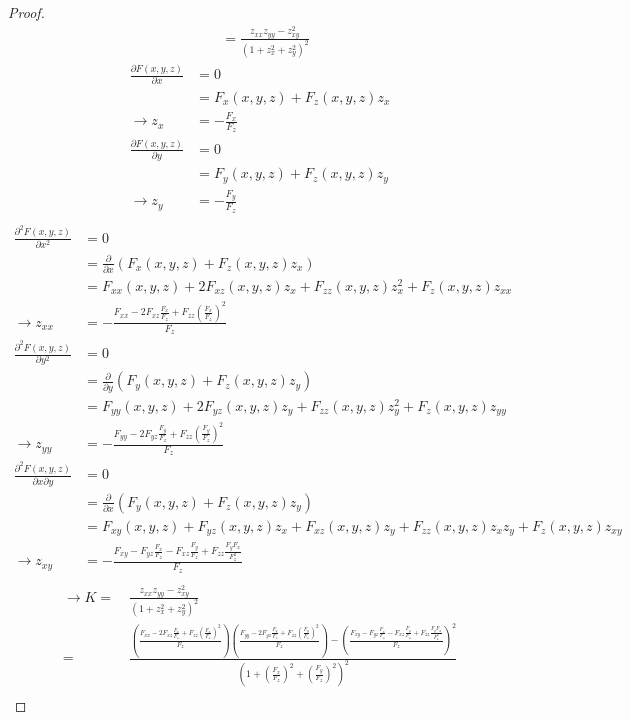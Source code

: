 \documentclass[10pt,a4paper]{article}
\begin{document}
\begin{proof}
\begin{align*}
&=\frac{z_{xx}z_{yy}-z_{xy}^2}{(1+z_x^2+z_y^2)^2}
\end{align*}
\begin{align*}
\frac{\partial F(x,y,z)}{\partial x}&=0\\
&=F_x(x,y,z)+F_z(x,y,z)z_x\\
\rightarrow z_x&=-\frac{F_x}{F_z}\\
\frac{\partial F(x,y,z)}{\partial y}&=0\\
&=F_y(x,y,z)+F_z(x,y,z)z_y\\
\rightarrow z_y&=-\frac{F_y}{F_z}\\
\end{align*}
\begin{align*}
\frac{\partial^2 F(x,y,z)}{\partial x^2}&=0\\
&=\frac{\partial}{\partial x}(F_x(x,y,z)+F_z(x,y,z)z_x)\\
&=F_{xx}(x,y,z)+2F_{xz}(x,y,z)z_x+F_{zz}(x,y,z)z_x^2+F_z(x,y,z)z_{xx}\\
\rightarrow z_{xx}&=-\frac{F_{xx}-2F_{xz}\frac{F_x}{F_z}+F_{zz}\left(\frac{F_x}{F_z}\right)^2}{F_z}\\
\frac{\partial^2 F(x,y,z)}{\partial y^2}&=0\\
&=\frac{\partial}{\partial y}(F_y(x,y,z)+F_z(x,y,z)z_y)\\
&=F_{yy}(x,y,z)+2F_{yz}(x,y,z)z_y+F_{zz}(x,y,z)z_y^2+F_z(x,y,z)z_{yy}\\
\rightarrow z_{yy}&=-\frac{F_{yy}-2F_{yz}\frac{F_y}{F_z}+F_{zz}\left(\frac{F_y}{F_z}\right)^2}{F_z}\\
\frac{\partial^2 F(x,y,z)}{\partial x\partial y}&=0\\
&=\frac{\partial}{\partial x}(F_y(x,y,z)+F_z(x,y,z)z_y)\\
&=F_{xy}(x,y,z)+F_{yz}(x,y,z)z_x+F_{xz}(x,y,z)z_y+F_{zz}(x,y,z)z_xz_y+F_z(x,y,z)z_{xy}\\
\rightarrow z_{xy}&=-\frac{F_{xy}-F_{yz}\frac{F_x}{F_z}-F_{xz}\frac{F_y}{F_z}+F_{zz}\frac{F_yF_x}{F_z^2}}{F_z}\\
\end{align*}
\begin{align*}
\rightarrow K=&\ \frac{z_{xx}z_{yy}-z_{xy}^2}{(1+z_x^2+z_y^2)^2}\\
=&\ \frac{\left(\frac{F_{xx}-2F_{xz}\frac{F_x}{F_z}+F_{zz}\left(\frac{F_x}{F_z}\right)^2}{F_z}\right)\left(\frac{F_{yy}-2F_{yz}\frac{F_y}{F_z}+F_{zz}\left(\frac{F_y}{F_z}\right)^2}{F_z}\right)-\left(\frac{F_{xy}-F_{yz}\frac{F_x}{F_z}-F_{xz}\frac{F_y}{F_z}+F_{zz}\frac{F_yF_x}{F_z^2}}{F_z}\right)^2}{(1+\left(\frac{F_x}{F_z}\right)^2+\left(\frac{F_y}{F_z}\right)^2)^2}\\

\end{align*}
\end{proof}
\end{document}
